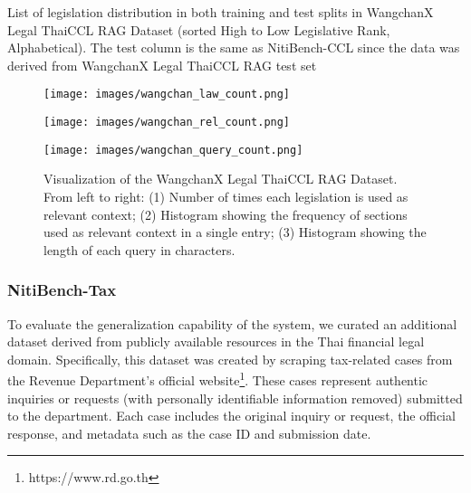 \begin{table}[]
\caption{List of legislation distribution in both training and test splits in WangchanX Legal ThaiCCL RAG Dataset (sorted High to Low Legislative Rank, Alphabetical). The test column is the same as NitiBench-CCL since the data was derived from WangchanX Legal ThaiCCL RAG test set}
\label{tab:wcxccc}
\end{table}

\endgroup

\begin{figure}[H]
    \centering
    \begin{minipage}{0.46\textwidth}
        \centering
        \texttt{[image: images/wangchan\_law\_count.png]}
    \end{minipage}%
    \hfill
    \begin{minipage}{0.26\textwidth}
        \centering
        \texttt{[image: images/wangchan\_rel\_count.png]}
    \end{minipage}%
    \hfill
    \begin{minipage}{0.26\textwidth}
        \centering
        \texttt{[image: images/wangchan\_query\_count.png]}
    \end{minipage}

    \caption{Visualization of the WangchanX Legal ThaiCCL RAG Dataset. From left to right: (1) Number of times each legislation is used as relevant context; (2) Histogram showing the frequency of sections used as relevant context in a single entry; (3) Histogram showing the length of each query in characters.}
    \label{fig:combined}
\end{figure}



\subsubsection{NitiBench-Tax}
\label{subsubsec: tax_dataset}

To evaluate the generalization capability of the system, we curated an additional dataset derived from publicly available resources in the Thai financial legal domain.
%
Specifically, this dataset was created by scraping tax-related cases from the Revenue Department's official website\footnote{https://www.rd.go.th}. 
%
These cases represent authentic inquiries or requests (with personally identifiable information removed) submitted to the department. 
%
Each case includes the original inquiry or request, the official response, and metadata such as the case ID and submission date.

